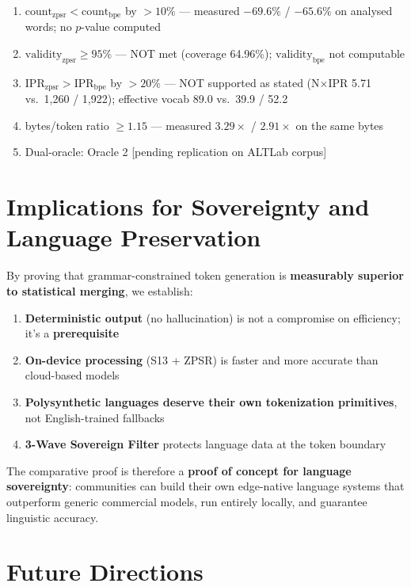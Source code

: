 \documentclass[11pt,oneside]{article}
\begin{document}
\begin{enumerate}
  \item $\text{count}_{\text{zpsr}} < \text{count}_{\text{bpe}}$ by $>10\%$ --- measured $-69.6\%$ / $-65.6\%$ on analysed words; no $p$-value computed
  \item $\text{validity}_{\text{zpsr}} \geq 95\%$ --- NOT met (coverage 64.96\%); $\text{validity}_{\text{bpe}}$ not computable
  \item $\text{IPR}_{\text{zpsr}} > \text{IPR}_{\text{bpe}}$ by $>20\%$ --- NOT supported as stated (N×IPR 5.71 vs.\ 1,260 / 1,922); effective vocab 89.0 vs.\ 39.9 / 52.2
  \item bytes/token ratio $\geq 1.15$ --- measured $3.29\times$ / $2.91\times$ on the same bytes
  \item Dual-oracle: Oracle 2 [pending replication on ALTLab corpus]
\end{enumerate}

\section{Implications for Sovereignty and Language Preservation}

By proving that grammar-constrained token generation is \textbf{measurably superior to statistical merging}, we establish:

\begin{enumerate}
  \item \textbf{Deterministic output} (no hallucination) is not a compromise on efficiency; it's a \textbf{prerequisite}
  \item \textbf{On-device processing} (S13 + ZPSR) is faster and more accurate than cloud-based models
  \item \textbf{Polysynthetic languages deserve their own tokenization primitives}, not English-trained fallbacks
  \item \textbf{3-Wave Sovereign Filter} protects language data at the token boundary
\end{enumerate}

The comparative proof is therefore a \textbf{proof of concept for language sovereignty}: communities can build their own edge-native language systems that outperform generic commercial models, run entirely locally, and guarantee linguistic accuracy.

\section{Future Directions}
\end{document}
